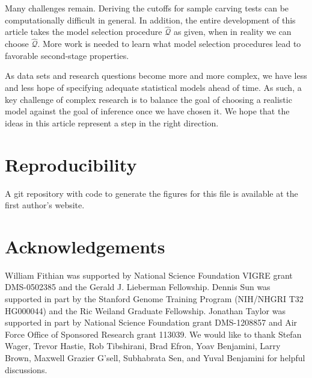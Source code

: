 \documentclass{article}
\theoremstyle{definition}
\newcommand{\hcQ}{\widehat{\mathcal{Q}}}
\begin{document}
Many challenges remain. Deriving the cutoffs for sample carving tests can be computationally difficult in general. In addition, the entire development of this article takes the model selection procedure $\hcQ$ as given, when in reality we can choose $\hcQ$. More work is needed to learn what model selection procedures lead to favorable second-stage properties.

As data sets and research questions become more and more complex, we have less and less hope of specifying  adequate statistical models ahead of time. As such, a key challenge of complex research is to balance the goal of choosing a realistic model against the goal of inference once we have chosen it. We hope that the ideas in this article represent a step in the right direction.

\section*{Reproducibility}

A git repository with code to generate the figures for this file is available at the first author's website.

\section*{Acknowledgements}
William Fithian was supported by National Science Foundation VIGRE grant DMS-0502385 and the Gerald J. Lieberman Fellowship.
Dennis Sun was supported in part by the Stanford Genome Training Program (NIH/NHGRI T32 HG000044) and the Ric Weiland Graduate Fellowship.
Jonathan Taylor was supported in part by National Science Foundation grant DMS-1208857 and
Air Force Office of Sponsored Research grant 113039.
We would like to thank Stefan Wager, Trevor Hastie, Rob Tibshirani, Brad Efron, Yoav Benjamini, Larry Brown, Maxwell Grazier G'sell, Subhabrata Sen, and Yuval Benjamini for helpful discussions.



\end{document}
